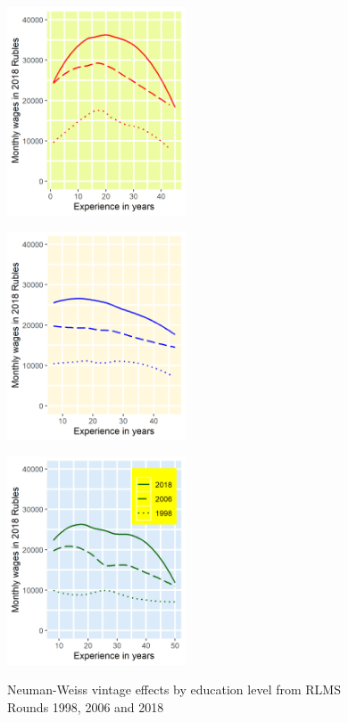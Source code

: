 \documentclass[alpha-refs]{wiley-article-02b}
\begin{document}
	\begin{figure}[htbp!]
\hspace{0.35in}
		\begin{minipage}[b]{.3\linewidth}
			\centering
			\hspace*{-0.7in}
			\includegraphics[width=150pt]{dp01_he.png}
			\label{fig:2.1a}
		\end{minipage}
		\hfill
		\begin{minipage}[b]{.3\linewidth}
			\centering
			\hspace*{-0.7in}
			\includegraphics[width=150pt]{dp01_ve.png}
			\label{fig:2.1b}
		\end{minipage}
		\hfill
		\begin{minipage}[b]{.3\linewidth}
			\centering
			\hspace*{-0.7in}
			\includegraphics[width=150pt]{dp01_se.png}
			\label{fig:2.1c}
		\end{minipage}
		\caption{Neuman-Weiss vintage effects by education level from RLMS Rounds 1998, 2006 and 2018}\label{fig:2.1}
	\end{figure}
	
\end{document}
